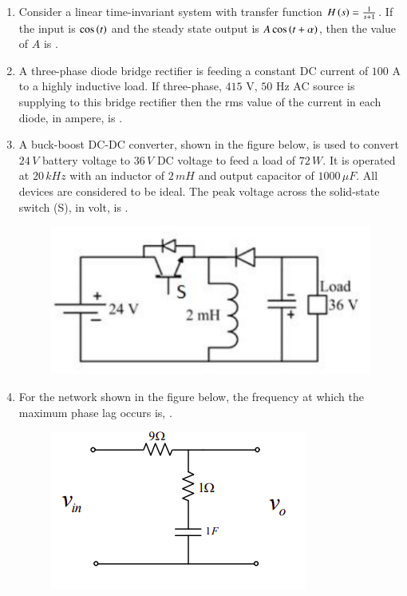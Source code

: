 \documentclass[journal,12pt,onecolumn]{IEEEtran}
\theoremstyle{remark}
\begin{document}
\begin{enumerate}[start=1, label=Q.\arabic*]
    \hfill{}

    \item Consider a linear time-invariant system with transfer function $H\left(s\right) = \frac{1}{s+1}$. If the input is $\cos\left(t\right)$ and the steady state output is $A \cos\left(t+\alpha\right)$, then the value of $A$ is \underline{\hspace{2cm}}.

    \hfill{}

    \item A three-phase diode bridge rectifier is feeding a constant DC current of $100$ A to a highly inductive load. If three-phase, $415$ V, $50$ Hz AC source is supplying to this bridge rectifier then the rms value of the current in each diode, in ampere, is \underline{\hspace{2cm}}.

    \hfill{}

    \item A buck-boost DC-DC converter, shown in the figure below, is used to convert $24 \, V$ battery voltage 
to $36 \, V$ DC voltage to feed a load of $72 \, W$. It is operated at $20 \, kHz$ with an inductor of $2 \, mH$ and 
output capacitor of $1000 \, \mu F$. All devices are considered to be ideal. The peak voltage across the 
solid-state switch (S), in volt, is \underline{\hspace{2cm}}.
    \begin{figure}[H]
        \includegraphics[width=0.6\columnwidth]{Figures/2q20.png}
        \centering
        \caption{}
    \end{figure}

    \hfill{}

    \item For the network shown in the figure below, the frequency  at which the maximum phase lag occurs is, \underline{\hspace{2cm}}.
    \begin{figure}[H]
        \includegraphics[width=0.3\columnwidth]{Figures/2q21.png}
        \centering
        \caption{}
    \end{figure}


\end{enumerate}
\end{document}
